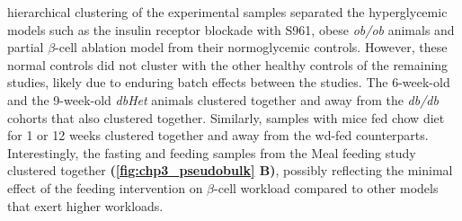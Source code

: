 hierarchical clustering of the experimental samples separated the hyperglycemic models such as the insulin receptor blockade with S961, obese \textit{ob/ob} animals and partial $\beta$-cell ablation model from their normoglycemic controls. However, these normal controls did not cluster with the other healthy controls of the remaining studies, likely due to enduring batch effects between the studies. The 6-week-old and the 9-week-old  \textit{dbHet} animals clustered together and away from the \textit{db/db} cohorts that also clustered together. Similarly, samples with mice fed chow diet for 1 or 12 weeks clustered together and away from the \gls{wd}-fed counterparts. Interestingly, the fasting and feeding samples from the Meal feeding study clustered together \textbf{(\autoref{fig:chp3_pseudobulk} B)}, possibly reflecting the minimal effect of the feeding intervention on $\beta$-cell workload compared to other models that exert higher workloads.\\

